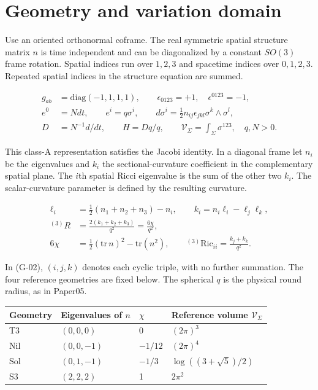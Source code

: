 \section{Geometry and variation domain}

Use an oriented orthonormal coframe. The real symmetric spatial structure matrix $n$ is time independent and can be diagonalized by a constant $SO(3)$ frame rotation. Spatial indices run over $1,2,3$ and spacetime indices over $0,1,2,3$. Repeated spatial indices in the structure equation are summed.

\begin{equation}\tag{G-01}\label{eq:G-01}
\begin{aligned}
g_{ab}&=\mathrm{diag}(-1,1,1,1),\qquad \epsilon_{0123}=+1,\quad \epsilon^{0123}=-1,\\
e^0&=Ndt,\qquad e^i=q\sigma^i,\qquad
d\sigma^i=\tfrac12 n_{ij}\epsilon_{jkl}\sigma^k\wedge\sigma^l,\\
D&=N^{-1}d/dt,\qquad H=Dq/q,\qquad
\mathcal V_{\Sigma}=\int_{\Sigma}\sigma^{123},\quad q,N>0.
\end{aligned}
\end{equation}

This class-A representation satisfies the Jacobi identity. In a diagonal frame let $n_i$ be the eigenvalues and $k_i$ the sectional-curvature coefficient in the complementary spatial plane. The $i$th spatial Ricci eigenvalue is the sum of the other two $k_i$. The scalar-curvature parameter is defined by the resulting curvature.

\begin{equation}\tag{G-02}\label{eq:G-02}
\begin{aligned}
\ell_i&=\tfrac12(n_1+n_2+n_3)-n_i,\qquad
k_i=n_i\ell_i-\ell_j\ell_k,\\
{}^{(3)}R&=\frac{2(k_1+k_2+k_3)}{q^2}=\frac{6\chi}{q^2},\\
6\chi&=\tfrac12(\mathrm{tr}\,n)^2-\mathrm{tr}(n^2),\qquad
{}^{(3)}\mathrm{Ric}_{ii}=\frac{k_j+k_k}{q^2}.
\end{aligned}
\end{equation}

In (G-02), $(i,j,k)$ denotes each cyclic triple, with no further summation. The four reference geometries are fixed below. The spherical $q$ is the physical round radius, as in Paper05.

\begin{center}\small
\begin{tabularx}{\textwidth}{@{}lllX@{}}
\toprule
Geometry & Eigenvalues of $n$ & $\chi$ & Reference volume $\mathcal V_{\Sigma}$\\\midrule
T3 & $(0,0,0)$ & 0 & $(2\pi)^3$\\
Nil & $(0,0,-1)$ & $-1/12$ & $(2\pi)^4$\\
Sol & $(0,1,-1)$ & $-1/3$ & $\log((3+\sqrt5)/2)$\\
S3 & $(2,2,2)$ & 1 & $2\pi^2$\\
\bottomrule
\end{tabularx}
\end{center}

